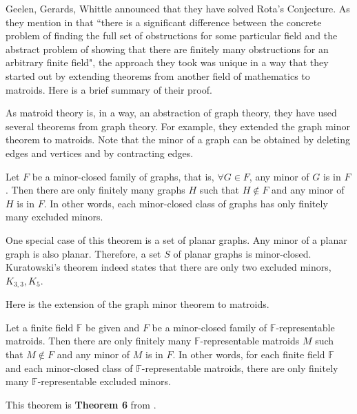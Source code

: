Geelen, Gerards, Whittle announced that they have solved Rota's Conjecture.
As they mention in \cite{solving} that ``there is a significant difference between the concrete problem of finding the full set of obstructions for some particular field and the abstract problem of showing that there are finitely many obstructions for an arbitrary finite field",
the approach they took was unique in a way that they started out by extending theorems from another field of mathematics to matroids.
Here is a brief summary of their proof.

As matroid theory is, in a way, an abstraction of graph theory, they have used several theorems from graph theory.
For example, they extended the graph minor theorem to matroids.
Note that the minor of a graph can be obtained by deleting edges and vertices and by contracting edges.

\begin{thm}
Let $F$ be a minor-closed family of graphs, that is, $\forall G \in F$, any minor of $G$ is in $F$.
Then there are only finitely many graphs $H$ such that $H \notin F$ and any minor of $H$ is in $F$.
In other words, each minor-closed class of graphs has only finitely many excluded minors.
\end{thm}

One special case of this theorem is a set of planar graphs.
Any minor of a planar graph is also planar.
Therefore, a set $S$ of planar graphs is minor-closed.
Kuratowski's theorem indeed states that there are only two excluded minors, $K_{3, 3}, K_5$.

Here is the extension of the graph minor theorem to matroids.

\begin{thm} 
Let a finite field $\mathbb{F}$ be given and $F$ be a minor-closed family of $\mathbb{F}$-representable matroids.
Then there are only finitely many $\mathbb{F}$-representable matroids $M$ such that $M \notin F$ and any minor of $M$ is in $F$.
In other words, for each finite field $\mathbb{F}$ and each minor-closed class of $\mathbb{F}$-representable matroids, there are only finitely many $\mathbb{F}$-representable excluded minors.
\end{thm}

This theorem is \textbf{Theorem 6} from \cite{solving}.

